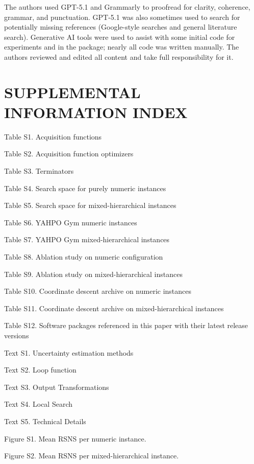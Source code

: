 \documentclass[12pt,letterpaper]{article}
\begin{document}
The authors used GPT-5.1 and Grammarly to proofread for clarity, coherence, grammar, and punctuation. 
GPT-5.1 was also sometimes used to search for potentially missing references (Google-style searches and general literature search).
Generative AI tools were used to assist with some initial code for experiments and in the package; nearly all code was written manually.
The authors reviewed and edited all content and take full responsibility for it.

\newpage

\section*{SUPPLEMENTAL INFORMATION INDEX}




\begin{description}
  \item Table S1. Acquisition functions
  \item Table S2. Acquisition function optimizers 
  \item Table S3. Terminators
  \item Table S4. Search space for purely numeric instances
  \item Table S5. Search space for mixed-hierarchical instances
  \item Table S6. YAHPO Gym numeric instances
  \item Table S7. YAHPO Gym mixed-hierarchical instances
  \item Table S8. Ablation study on numeric configuration
  \item Table S9. Ablation study on mixed-hierarchical instances
  \item Table S10. Coordinate descent archive on numeric instances
  \item Table S11. Coordinate descent archive on mixed-hierarchical instances
  \item Table S12. Software packages referenced in this paper with their latest release versions
  \item Text S1. Uncertainty estimation methods
  \item Text S2. Loop function
  \item Text S3. Output Transformations
  \item Text S4. Local Search
  \item Text S5. Technical Details
  \item Figure S1. Mean RSNS per numeric instance.
  \item Figure S2. Mean RSNS per mixed-hierarchical instance.
\end{description}
\end{document}
